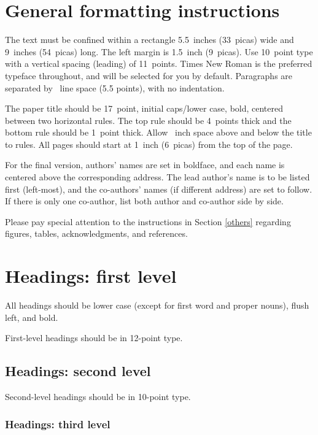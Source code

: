 \documentclass{article}
\begin{document}
\section{General formatting instructions}
\label{gen_inst}


The text must be confined within a rectangle 5.5~inches (33~picas) wide and
9~inches (54~picas) long. The left margin is 1.5~inch (9~picas).  Use 10~point
type with a vertical spacing (leading) of 11~points.  Times New Roman is the
preferred typeface throughout, and will be selected for you by default.
Paragraphs are separated by ~line space (5.5 points), with no
indentation.


The paper title should be 17~point, initial caps/lower case, bold, centered
between two horizontal rules. The top rule should be 4~points thick and the
bottom rule should be 1~point thick. Allow ~inch space above and
below the title to rules. All pages should start at 1~inch (6~picas) from the
top of the page.


For the final version, authors' names are set in boldface, and each name is
centered above the corresponding address. The lead author's name is to be listed
first (left-most), and the co-authors' names (if different address) are set to
follow. If there is only one co-author, list both author and co-author side by
side.


Please pay special attention to the instructions in Section \ref{others}
regarding figures, tables, acknowledgments, and references.

\section{Headings: first level}
\label{headings}


All headings should be lower case (except for first word and proper nouns),
flush left, and bold.


First-level headings should be in 12-point type.


\subsection{Headings: second level}


Second-level headings should be in 10-point type.


\subsubsection{Headings: third level}
\end{document}
